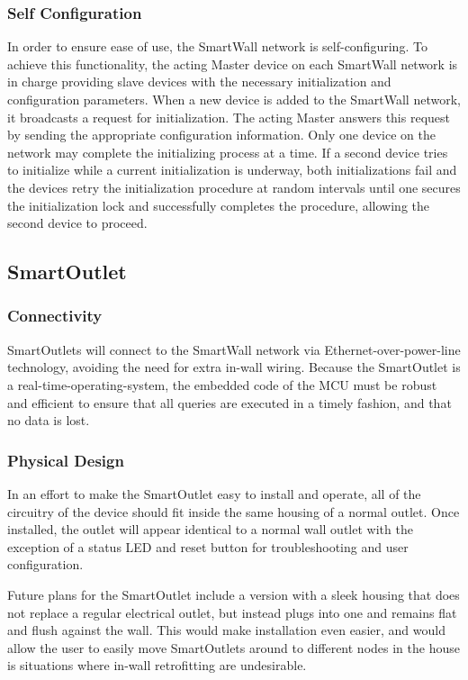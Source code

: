 \documentclass[11pt]{article}
\begin{document}
\subsubsection{Self Configuration}
\label{sec:Design.SmartWallProtocol.SelfConfiguration}
In order to ensure ease of use, the SmartWall network is
self-configuring. To achieve this functionality, the acting Master device
on each SmartWall network is in charge providing slave devices with
the necessary
initialization and configuration parameters. When a new device is
added to the SmartWall network, it broadcasts a request for
initialization. The acting Master answers this request by sending the
appropriate configuration information. Only one device on the network
may complete the initializing process at a time. If a second device
tries to initialize while a current initialization is underway, both
initializations fail and the devices retry the initialization
procedure at random
intervals until one secures the initialization lock and successfully
completes the procedure, allowing the second device to proceed.

\subsection{SmartOutlet}
\subsubsection{Connectivity}
SmartOutlets will connect to the SmartWall network via
Ethernet-over-power-line technology, avoiding the need for extra
in-wall wiring.  Because the SmartOutlet is a
real-time-operating-system, the embedded code of the MCU must be
robust and efficient to ensure that all queries are executed in a
timely fashion, and that no data is lost.

\subsubsection{Physical Design}
In an effort to make the SmartOutlet easy to install and operate, all
of the circuitry of the device should fit inside the same
housing of a normal outlet. Once installed, the outlet will appear
identical to a normal wall outlet with the exception of a status LED
and reset button for troubleshooting and user configuration.

Future plans for the
SmartOutlet include a version with a sleek housing that does not
replace a regular electrical outlet, but instead plugs into one and
remains flat and flush against the wall.  This would make installation
even easier, and would allow the user to easily move SmartOutlets
around to different nodes in the house is situations where in-wall
retrofitting are undesirable.
\end{document}
